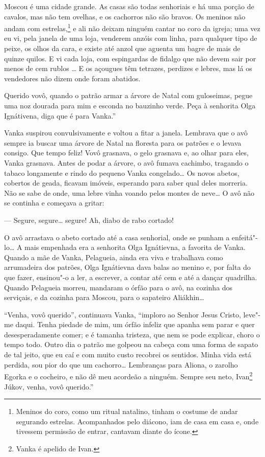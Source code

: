 Moscou é uma cidade grande. As casas são todas senhoriais e há uma
porção de cavalos, mas não tem ovelhas, e os cachorros não são bravos.
Os meninos não andam com estrelas,\footnote{Meninos do coro, como um
  ritual natalino, tinham o costume de andar segurando estrelas.
  Acompanhados pelo diácono, iam de casa em casa e, onde tivessem
  permissão de entrar, cantavam diante do ícone.} e ali não deixam
ninguém cantar no coro da igreja; uma vez eu vi, pela janela de uma
loja, venderem anzóis com linha, para qualquer tipo de peixe, os olhos
da cara, e existe até anzol que aguenta um bagre de mais de quinze
quilos. E vi cada loja, com espingardas de fidalgo que não devem
sair por menos de cem rublos \ldots{} E os açougues têm tetrazes, perdizes e
lebres, mas lá os vendedores não dizem onde foram abatidos.

Querido vovô, quando o patrão armar a árvore de Natal com guloseimas,
pegue uma noz dourada para mim e esconda no bauzinho verde. Peça à
senhorita Olga Ignátivena, diga que é para Vanka.''

Vanka suspirou convulsivamente e voltou a fitar a janela. Lembrava que o
avô sempre ia buscar uma árvore de Natal na floresta para os patrões e o
levava consigo. Que tempo feliz! Vovô grasnava, o gelo grasnava e, ao
olhar para eles, Vanka grasnava. Antes de podar a árvore, o avô fumava
cachimbo, tragando o tabaco longamente e rindo do pequeno Vanka
congelado\ldots{} Os novos abetos, cobertos de geada, ficavam imóveis,
esperando para saber qual deles morreria. Não se sabe de onde, uma lebre
vinha voando pelos montes de neve\ldots{} O avô não se continha e começava a
gritar:

--- Segure, segure\ldots{} segure! Ah, diabo de rabo cortado!

O avô arrastava o abeto cortado até a casa senhorial, onde se punham a
enfeitá"-lo\ldots{} A mais empenhada era a senhorita Olga Ignátievna, a
favorita de Vanka. Quando a mãe de Vanka, Pelagueia, ainda era viva e
trabalhava como arrumadeira dos patrões, Olga Ignátievna dava balas ao
menino e, por falta do que fazer, ensinou"-o a ler, a escrever, a contar
até cem e até a dançar quadrilha. Quando Pelagueia morreu, mandaram o
órfão para o avô, na cozinha dos serviçais, e da cozinha para Moscou,
para o sapateiro Aliákhin\ldots{}

``Venha, vovô querido'', continuava Vanka, ``imploro ao Senhor Jesus
Cristo, leve"-me daqui. Tenha piedade de mim, um órfão infeliz que apanha
sem parar e quer desesperadamente comer; e é tamanha tristeza, que nem
se pode explicar, choro o tempo todo. Outro dia o patrão me golpeou na
cabeça com uma forma de sapato de tal jeito, que eu caí e com muito
custo recobrei os sentidos. Minha vida está perdida, sou pior do que um
cachorro\ldots{} Lembranças para Aliona, o zarolho Egorka e o cocheiro, e não
dê meu acordeão a ninguém. Sempre seu neto, Ivan\footnote{Vanka é
  apelido de Ivan.} Júkov, venha, vovô querido.''

